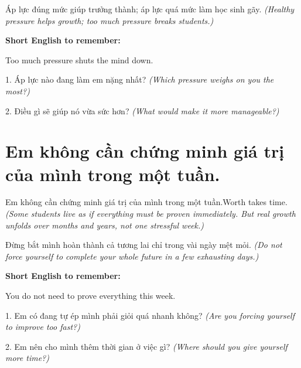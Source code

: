 \begin{baihoc}
Áp lực đúng mức giúp trưởng thành; áp lực quá mức làm học sinh gãy.
\textit{(Healthy pressure helps growth; too much pressure breaks students.)}
\end{baihoc}

\begin{ghinhoanh}
\textbf{Short English to remember:}

Too much pressure shuts the mind down.

\end{ghinhoanh}

\begin{tuhocnhanh}
1. Áp lực nào đang làm em nặng nhất? \textit{(Which pressure weighs on you the most?)}

2. Điều gì sẽ giúp nó vừa sức hơn? \textit{(What would make it more manageable?)}
\end{tuhocnhanh}
\ngancach


\section{Em không cần chứng minh giá trị của mình trong một tuần.}
\begin{truyen}{Em không cần chứng minh giá trị của mình trong một tuần.}{Worth takes time.}
\textit{(Some students live as if everything must be proven immediately. But real growth unfolds over months and years, not one stressful week.)}
\end{truyen}

\begin{baihoc}
Đừng bắt mình hoàn thành cả tương lai chỉ trong vài ngày mệt mỏi.
\textit{(Do not force yourself to complete your whole future in a few exhausting days.)}
\end{baihoc}

\begin{ghinhoanh}
\textbf{Short English to remember:}

You do not need to prove everything this week.

\end{ghinhoanh}

\begin{tuhocnhanh}
1. Em có đang tự ép mình phải giỏi quá nhanh không? \textit{(Are you forcing yourself to improve too fast?)}

2. Em nên cho mình thêm thời gian ở việc gì? \textit{(Where should you give yourself more time?)}
\end{tuhocnhanh}
\ngancach


